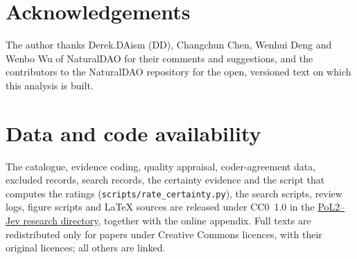 \section*{Acknowledgements}
The author thanks Derek.DAism (DD), Changchun Chen, Wenhui Deng and Wenbo Wu of NaturalDAO for their comments and suggestions, and the contributors to the NaturalDAO repository for the open, versioned \pol{} text on which this analysis is built.

\section*{Data and code availability}
The catalogue, evidence coding, quality appraisal, coder-agreement data, excluded records, search records, the certainty evidence and the script that computes the ratings (\nolinkurl{scripts/rate_certainty.py}), the search scripts, review logs, figure scripts and LaTeX sources are released under CC0~1.0 in the \href{https://github.com/naturaldao/NaturalDAO-2nd/tree/main/PoL-Governance/research/PoL2-Jev-Typed-Literature-Survey}{PoL2--Jev research directory}, together with the online appendix.
Full texts are redistributed only for papers under Creative Commons licences, with their original licences; all others are linked.
